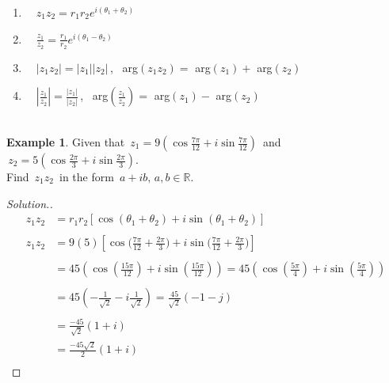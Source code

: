 \documentclass[11pt,a4paper]{article}
\theoremstyle{definition}
\newtheorem{example}[thm]{Example}
\newenvironment{solution}
  {\renewcommand{\qedsymbol}{}\begin{proof}[\textit{Solution}.]}
  {\end{proof}}
\begin{document}
\begin{enumerate}
\item[$*$] $\quad \displaystyle{z_1z_2 = r_1r_2 e^{i(\theta_1 + \theta_2)}}$\\

\item[$*$] $\quad \displaystyle{\frac{z_1}{z_2} = \frac{r_1}{r_2}e^{i(\theta_1 - \theta_2)}}$\\

\item[$*$] $\quad \left|z_1z_2\right| = \left|z_1\right|\left|z_2\right|\,$, $\, $ arg$(z_1z_2) = $ arg$(z_1) + $ arg$(z_2)$\\

\item[$*$] $\quad  \left|\frac{z_1}{z_2}\right| = \frac{\left|z_1\right|}{\left|z_2\right|}\,$, $\,$ arg$\left(\frac{z_1}{z_2}\right) = $ arg$(z_1) - $ arg$(z_2)$\\\\ 
\end{enumerate}






\begin{example}
Given that $\, z_1 = 9\left( \cos \frac{7\pi}{12} + i \sin \frac{7\pi}{12}\right)\,$ and $\, z_2 = 5\left( \cos \frac{2\pi}{3} +  i \sin \frac{2\pi}{3}\right)$.\\

Find $\, z_1z_2\,$  in the form $\, a + ib,\, a, b \in \mathbb{R}$.
\end{example}

\begin{solution}
\begin{align*}
z_1z_2 & = r_1r_2\left[\cos \left(\theta_1 + \theta_2\right) + i\sin\left(\theta_1 + \theta_2\right)\right]\\\\
z_1z_2 & = 9(5)\left[\cos \big(\frac{7\pi}{12} + \frac{2\pi}{3} \Big) + i\sin\Big(\frac{7\pi}{12}+ \frac{2\pi}{3} \Big)\right]\\\\
& = 45 \left( \cos \left(\frac{15\pi}{12}\right) + i\sin\left(\frac{15\pi}{12}\right)\right)
 = 45 \left( \cos \left(\frac{5\pi}{4}\right) + i\sin\left(\frac{5\pi}{4}\right)\right)\\\\
& = 45\left(-\frac{1}{\sqrt{2}} - i\frac{1}{\sqrt{2}}\right) = \frac{45}{\sqrt{2}}\left(-1 - j\right)\\\\
& = \frac{-45}{\sqrt{2}}\left( 1 + i\right)\\
& = \frac{-45\sqrt{2}}{2}\left(1 + i\right)\\
\end{align*}
\end{solution}
\end{document}
